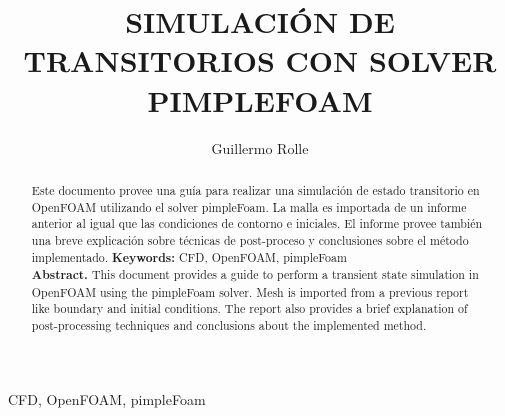 \documentclass[oneside,a4paper,spanish,links]{amca}
\title{SIMULACIÓN DE TRANSITORIOS CON SOLVER PIMPLEFOAM}
\author[a]{Guillermo Rolle}
\begin{document}
\vspace{3cm}

\maketitle


\begin{keywords}
CFD, OpenFOAM, pimpleFoam 
\end{keywords}

\begin{abstract}
Este documento provee una guía para realizar una simulación de estado transitorio en OpenFOAM utilizando el solver pimpleFoam. La malla es importada de un informe anterior al igual que las condiciones de contorno e iniciales. El informe provee también una breve explicación sobre técnicas de post-proceso y conclusiones sobre el método implementado.
\linebreak
%
\linebreak
%
\textbf{Keywords:} CFD, OpenFOAM, pimpleFoam\\
%
\linebreak
%
\textbf{Abstract.}
This document provides a guide to perform a transient state simulation in OpenFOAM using the pimpleFoam solver. Mesh is imported from a previous report like boundary and initial conditions. The report also provides a brief explanation of post-processing techniques and conclusions about the implemented method. 

\end{abstract}
\end{document}
